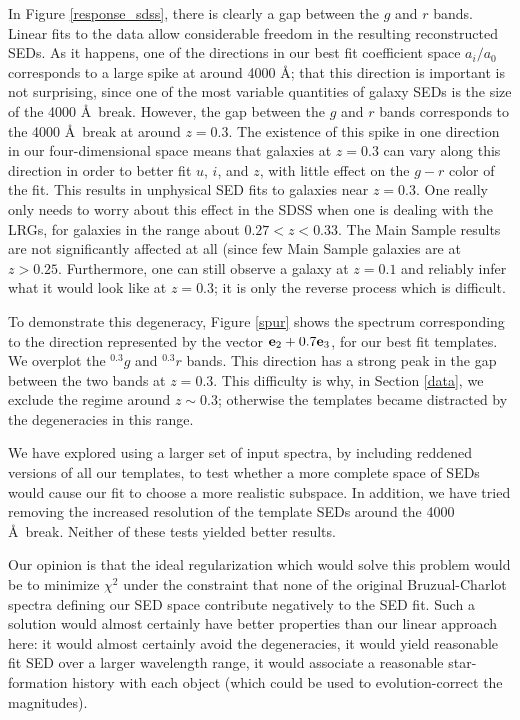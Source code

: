 \documentclass[10pt,preprint]{aastex}
\newcommand{\vv}[1]{{\bf #1}}
\newcommand{\band}[2]{\ensuremath{^{#1}\!{#2}}}
\begin{document}
In Figure \ref{response_sdss}, there is clearly a gap between the $g$
and $r$ bands. Linear fits to the data allow considerable freedom in
the resulting reconstructed SEDs. As it happens, one of the directions
in our best fit coefficient space $a_i/a_0$ corresponds to a large
spike at around 4000 \AA; that this direction is important is not
surprising, since one of the most variable quantities of galaxy SEDs
is the size of the 4000 \AA\ break. However, the gap between the $g$
and $r$ bands corresponds to the 4000 \AA\ break at around
$z=0.3$. The existence of this spike in one direction in our
four-dimensional space means that galaxies at $z=0.3$ can vary along
this direction in order to better fit $u$, $i$, and $z$, with little
effect on the $g-r$ color of the fit. This results in unphysical SED
fits to galaxies near $z=0.3$.  One really only needs to worry about
this effect in the SDSS when one is dealing with the LRGs, for
galaxies in the range about $0.27 < z < 0.33$. The Main Sample results
are not significantly affected at all (since few Main Sample galaxies
are at $z>0.25$.  Furthermore, one can still observe a galaxy at
$z=0.1$ and reliably infer what it would look like at $z=0.3$; it is
only the reverse process which is difficult.

To demonstrate this degeneracy, Figure \ref{spur} shows the spectrum
corresponding to the direction represented by the vector $ \vv{e}_2 +
0.7 \vv{e}_3$, for our best fit templates. We overplot the
\band{0.3}{g} and \band{0.3}{r} bands. This direction has a strong
peak in the gap between the two bands at $z=0.3$.  This difficulty is
why, in Section \ref{data}, we exclude the regime around $z\sim 0.3$;
otherwise the templates became distracted by the degeneracies in this
range.

We have explored using a larger set of input spectra, by including
reddened versions of all our templates, to test whether a more
complete space of SEDs would cause our fit to choose a more realistic
subspace. In addition, we have tried removing the increased resolution
of the template SEDs around the 4000 \AA\ break. Neither of these
tests yielded better results.

Our opinion is that the ideal regularization which would solve this
problem would be to minimize $\chi^2$ under the constraint that none
of the original Bruzual-Charlot spectra defining our SED space
contribute negatively to the SED fit. Such a solution would almost
certainly have better properties than our linear approach here: it
would almost certainly avoid the degeneracies, it would yield
reasonable fit SED over a larger wavelength range, it would associate
a reasonable star-formation history with each object (which could be
used to evolution-correct the magnitudes).
\end{document}

